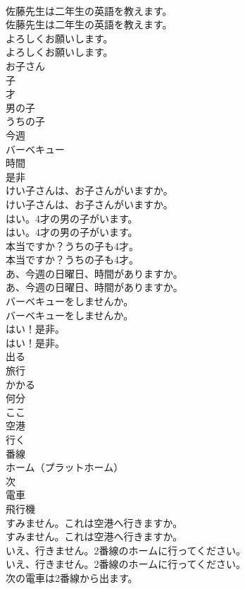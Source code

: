 \documentclass[8pt]{extreport}
\begin{document}
\begin{CJK}{UTF8}{min}
\\	佐藤先生は二年生の英語を教えます。	
\\	佐藤先生は二年生の英語を教えます。 
\\	よろしくお願いします。	
\\	よろしくお願いします。 
\\	お子さん
\\	子
\\	才
\\	男の子
\\	うちの子
\\	今週
\\	バーベキュー
\\	時間
\\	是非
\\	けい子さんは、お子さんがいますか。	
\\	けい子さんは、お子さんがいますか。 
\\	はい。4才の男の子がいます。	
\\	はい。4才の男の子がいます。 
\\	本当ですか？うちの子も4才。	
\\	本当ですか？うちの子も4才。 
\\	あ、今週の日曜日、時間がありますか。	
\\	あ、今週の日曜日、時間がありますか。 
\\	バーベキューをしませんか。	
\\	バーベキューをしませんか。 
\\	はい！是非。	
\\	はい！是非。 
\\	出る
\\	旅行
\\	かかる
\\	何分
\\	ここ
\\	空港
\\	行く
\\	番線
\\	ホーム（プラットホーム）
\\	次
\\	電車
\\	飛行機
\\	すみません。これは空港へ行きますか。	
\\	すみません。これは空港へ行きますか。 
\\	いえ、行きません。2番線のホームに行ってください。	
\\	いえ、行きません。2番線のホームに行ってください。 
\\	次の電車は2番線から出ます。	

\end{CJK}
\end{document}
